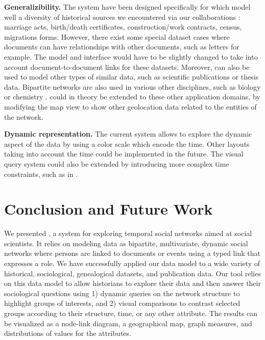 \textbf{Generalizibility.} The system have been designed specifically for \model which model well a diversity of historical sources we encountered via our collaborations : marriage acts, birth/death certificates, construction/work contracts, census, migrations forms. However, there exist some special dataset cases where documents can have relationships with other documents, such as letters for example. The model and interface would have to be slightly changed to take into account document-to-document links for these datasets.
Moreover, \model can also be used to model other types of similar data, such as scientific publications or thesis data.
Bipartite networks are also used in various other disciplines, such as biology \cite{klamt2009hypergraphs} or chemistry \cite{konstantinova2001application}. \name could in theory be extended to these other application domains, by modifying the map view to show other geolocation data related to the entities of the network.

\textbf{Dynamic representation.} The current system allows to explore the dynamic aspect of the data by using a color scale which encode the time. Other layouts taking into account the time could be implemented in the future. The visual query system could also be extended by introducing more complex time constraints, such as in \cite{monroe2012exploring}.




\section{Conclusion and Future Work}

We presented \name, a system for exploring temporal social networks aimed at social scientists. It relies on modeling data as bipartite, multivariate, dynamic social networks where persons are linked to documents or events using a typed link that expresses a role.
We have successfully applied our data model to a wide variety of historical, sociological, genealogical datasets, and publication data.
Our tool \name relies on this data model to allow historians to explore their data and then answer their sociological questions using 1) dynamic queries on the network structure to highlight groups of interests, and 2) visual comparisons to contrast selected groups according to their structure, time, or any other attribute.
The results can be visualized as a node-link diagram, a geographical map, graph measures, and distributions of values for the attributes.

